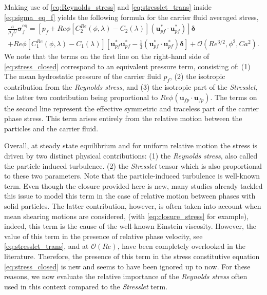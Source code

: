 Making use of \ref{eq:Reynolds_stress} and \ref{eq:stresslet_trans} inside \ref{eq:sigma_eq_f} yields the following formula for the carrier fluid averaged stress, 
\begin{multline}
    \frac{a }{\mu_f U}\bm{\sigma}^\text{eq}_f = 
    \left[ p_f + Re \phi  [C^{Re}_2(\phi,\lambda) - C_2(\lambda)](\textbf{u}_{pf}^*\cdot \textbf{u}_{pf}^*) \right]\bm\delta \\
    + Re \phi [C^{Re}_1(\phi,\lambda) - C_1(\lambda)]\left[
            \textbf{u}_{pf}^*\textbf{u}_{pf}^*
            - \frac{1}{3}(\textbf{u}_{pf}^*\cdot \textbf{u}_{pf}^*)\bm\delta
    \right]
    + \mathcal{O}(Re^{3/2},\phi^2, Ca^2 ).
    \label{eq:stress_closed}
\end{multline} 
We note that the terms on the first line on the right-hand side of \ref{eq:stress_closed} correspond to an equivalent pressure term, consisting of:  
(1) The mean hydrostatic pressure of the carrier fluid $p_f$, 
(2) the isotropic contribution from the \textit{Reynolds stress}, and 
(3) the isotropic part of the \textit{Stresslet}, the latter two contribution being proportional to $Re \phi (\textbf{u}_{fp}\cdot \textbf{u}_{fp})$.  
The terms on the second line represent the effective symmetric and traceless part of the carrier phase stress. 
This term arises entirely from the relative motion between the particles and the carrier fluid. 



Overall, at steady state equilibrium and for uniform relative motion the stress is driven by two distinct physical contributions: 
(1) the \textit{Reynolds stress}, also called the particle induced turbulence. 
(2) the \textit{Stresslet} tensor which is also proportional to these two parameters. 
Note that the particle-induced turbulence is well-known term. 
Even though the closure provided here is new, many studies already tackled this issue to model this term in the case of relative motion between phases with solid particles. 
The latter contribution, however, is often taken into account when mean shearing motions are considered, (with \ref{eq:closure_stress} for example), indeed, this term is the cause of the well-known Einstein viscosity. 
However, the value of this term in the presence of relative phase velocity, see \ref{eq:stresslet_trans},  and at $\mathcal{O}(Re)$, have been completely overlooked in the literature. 
Therefore, the presence of this term in the stress constitutive equation \eqref{eq:stress_closed}  is new and seems to have been ignored up to now. 
For these reasons, we now evaluate the relative importance of the \textit{Reynolds stress} often used in this context compared to the \textit{Stresslet} term. 

